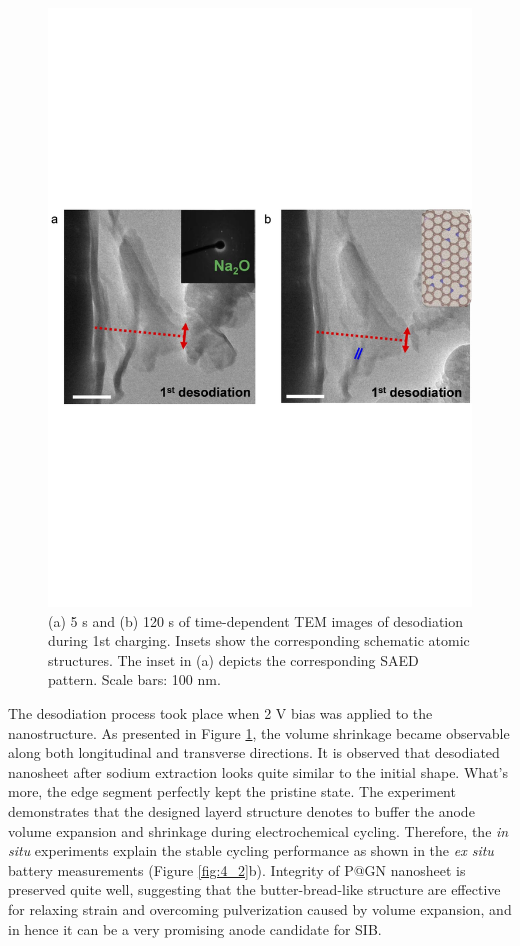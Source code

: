 \begin{figure}  
\includegraphics[width=\textwidth,angle=0]{figures/figure4_3ef}
\caption[{\it In situ} desodiation process on P@GN SIB]
{
  (a) 5 s and (b) 120 s of time-dependent TEM images of desodiation during 1st charging. Insets show the corresponding schematic atomic structures. The inset in (a) depicts the corresponding SAED pattern. Scale bars: 100 nm.
\label{fig:4_3ef}}
\end{figure}

The desodiation process took place when 2 V bias was applied to the nanostructure. As presented in Figure \ref{fig:4_3ef}, the volume shrinkage became observable along both longitudinal and transverse directions. 
It is observed that desodiated nanosheet after sodium extraction looks quite similar to the initial shape. What's more, the edge segment perfectly kept the pristine state. 
The experiment demonstrates that the designed layerd structure denotes to buffer the anode volume expansion and shrinkage during electrochemical cycling. 
Therefore, the {\em in situ} experiments explain the stable cycling performance as shown in the {\em ex situ} battery measurements (Figure \ref{fig:4_2}b). 
Integrity of P@GN nanosheet is preserved quite well, suggesting that the butter-bread-like structure are effective for relaxing strain and overcoming pulverization caused by volume expansion, and in hence it can be a very promising anode candidate for SIB.\\


